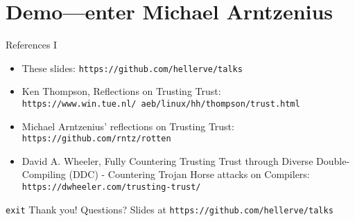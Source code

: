 \documentclass[aspectratio=169]{beamer}
\begin{document}
  \section{Demo—enter Michael Arntzenius}
  \begin{frame}{References I}
    \begin{itemize}
      \item These slides: \texttt{https://github.com/hellerve/talks}
      \item Ken Thompson, Reflections on Trusting Trust: \texttt{https://www.win.tue.nl/~aeb/linux/hh/thompson/trust.html}
      \item Michael Arntzenius’ reflections on Trusting Trust: \texttt{https://github.com/rntz/rotten}
      \item David A. Wheeler, Fully Countering Trusting Trust through Diverse Double-Compiling (DDC) - Countering Trojan Horse attacks on Compilers: \texttt{https://dwheeler.com/trusting-trust/}
    \end{itemize}
  \end{frame}
  \begin{frame}{\texttt{exit}}
    \Huge Thank you!
    \linebreak
    \linebreak
    \linebreak
    \small Questions?
    \linebreak
    \linebreak
    \tiny Slides at \texttt{https://github.com/hellerve/talks}
  \end{frame}
\end{document}
